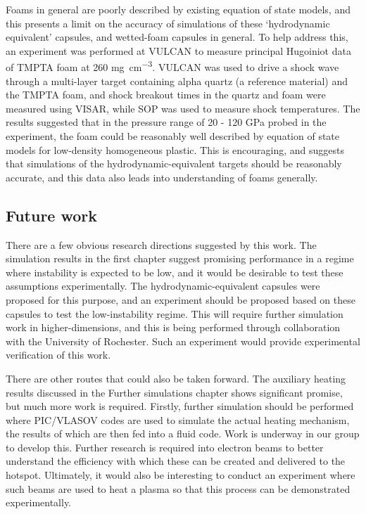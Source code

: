 Foams in general are poorly described by existing equation of state models, and this presents a limit on the accuracy of simulations of these `hydrodynamic equivalent' capsules, and wetted-foam capsules in general. To help address this, an experiment was performed at VULCAN to measure principal Hugoiniot data of TMPTA foam at 260 \unit{\milli\gram\per\centi\meter\cubed}. VULCAN was used to drive a shock wave through a multi-layer target containing alpha quartz (a reference material) and the TMPTA foam, and shock breakout times in the quartz and foam were measured using VISAR, while SOP was used to measure shock temperatures. The results suggested that in the pressure range of 20 - 120 \unit{\giga\pascal} probed in the experiment, the foam could be reasonably well described by equation of state models for low-density homogeneous plastic. This is encouraging, and suggests that simulations of the hydrodynamic-equivalent targets should be reasonably accurate, and this data also leads into understanding of foams generally.

\subsection{Future work}
There are a few obvious research directions suggested by this work. The simulation results in the first chapter suggest promising performance in a regime where instability is expected to be low, and it would be desirable to test these assumptions experimentally. The hydrodynamic-equivalent capsules were proposed for this purpose, and an experiment should be proposed based on these capsules to test the low-instability regime. This will require further simulation work in higher-dimensions, and this is being performed through collaboration with the University of Rochester. Such an experiment would provide experimental verification of this work.

There are other routes that could also be taken forward. The auxiliary heating results discussed in the Further simulations chapter shows significant promise, but much more work is required. Firstly, further simulation should be performed where PIC/VLASOV codes are used to simulate the actual heating mechanism, the results of which are then fed into a fluid code. Work is underway in our group to develop this. Further research is required into electron beams to better understand the efficiency with which these can be created and delivered to the hotspot. Ultimately, it would also be interesting to conduct an experiment where such beams are used to heat a plasma so that this process can be demonstrated experimentally.

